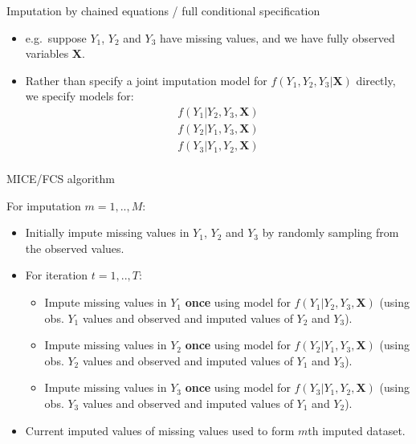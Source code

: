 \documentclass[ignorenonframetext,]{beamer}
\providecommand{\tightlist}{%
  \setlength{\itemsep}{0pt}\setlength{\parskip}{0pt}}
\begin{document}
\begin{frame}{Imputation by chained equations / full conditional
specification}
\protect\hypertarget{imputation-by-chained-equations-full-conditional-specification-1}{}

\begin{itemize}
\tightlist
\item
  e.g.~suppose \(Y_{1}\), \(Y_{2}\) and \(Y_{3}\) have missing values,
  and we have fully observed variables \(\mathbf X\).
\item
  Rather than specify a joint imputation model for
  \(f(Y_{1},Y_{2},Y_{3}|\mathbf X)\) directly, we specify models for:
  \begin{align*}
            f(Y_{1}|Y_{2},Y_{3},\mathbf X) \\
            f(Y_{2}|Y_{1},Y_{3},\mathbf X) \\
            f(Y_{3}|Y_{1},Y_{2},\mathbf X) \\
            \end{align*}
\end{itemize}

\end{frame}

\begin{frame}{MICE/FCS algorithm}
\protect\hypertarget{micefcs-algorithm}{}

For imputation \(m=1,..,M\):

\begin{itemize}
\tightlist
\item
  Initially impute missing values in \(Y_{1}\), \(Y_{2}\) and \(Y_{3}\)
  by randomly sampling from the observed values.
\item
  For iteration \(t=1,..,T\):

  \begin{itemize}
  \tightlist
  \item
    Impute missing values in \(Y_{1}\) \textbf{once} using model for
    \(f(Y_{1}|Y_{2},Y_{3},\mathbf X)\) (using obs. \(Y_{1}\) values and
    observed and imputed values of \(Y_{2}\) and \(Y_{3}\)).
  \item
    Impute missing values in \(Y_{2}\) \textbf{once} using model for
    \(f(Y_{2}|Y_{1},Y_{3},\mathbf X)\) (using obs. \(Y_{2}\) values and
    observed and imputed values of \(Y_{1}\) and \(Y_{3}\)).
  \item
    Impute missing values in \(Y_{3}\) \textbf{once} using model for
    \(f(Y_{3}|Y_{1},Y_{2},\mathbf X)\) (using obs. \(Y_{3}\) values and
    observed and imputed values of \(Y_{1}\) and \(Y_{2}\)).
  \end{itemize}
\item
  Current imputed values of missing values used to form \(m\)th imputed
  dataset.
\end{itemize}

\end{frame}
\end{document}
